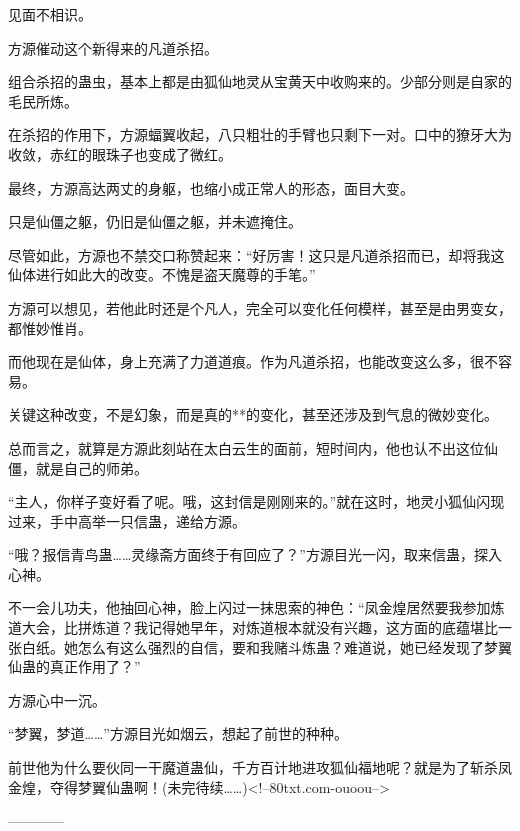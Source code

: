 \begin{this_body}
见面不相识。

方源催动这个新得来的凡道杀招。

组合杀招的蛊虫，基本上都是由狐仙地灵从宝黄天中收购来的。少部分则是自家的毛民所炼。

在杀招的作用下，方源蝠翼收起，八只粗壮的手臂也只剩下一对。口中的獠牙大为收敛，赤红的眼珠子也变成了微红。

最终，方源高达两丈的身躯，也缩小成正常人的形态，面目大变。

只是仙僵之躯，仍旧是仙僵之躯，并未遮掩住。

尽管如此，方源也不禁交口称赞起来：“好厉害！这只是凡道杀招而已，却将我这仙体进行如此大的改变。不愧是盗天魔尊的手笔。”

方源可以想见，若他此时还是个凡人，完全可以变化任何模样，甚至是由男变女，都惟妙惟肖。

而他现在是仙体，身上充满了力道道痕。作为凡道杀招，也能改变这么多，很不容易。

关键这种改变，不是幻象，而是真的**的变化，甚至还涉及到气息的微妙变化。

总而言之，就算是方源此刻站在太白云生的面前，短时间内，他也认不出这位仙僵，就是自己的师弟。

“主人，你样子变好看了呢。哦，这封信是刚刚来的。”就在这时，地灵小狐仙闪现过来，手中高举一只信蛊，递给方源。

“哦？报信青鸟蛊……灵缘斋方面终于有回应了？”方源目光一闪，取来信蛊，探入心神。

不一会儿功夫，他抽回心神，脸上闪过一抹思索的神色：“凤金煌居然要我参加炼道大会，比拼炼道？我记得她早年，对炼道根本就没有兴趣，这方面的底蕴堪比一张白纸。她怎么有这么强烈的自信，要和我赌斗炼蛊？难道说，她已经发现了梦翼仙蛊的真正作用了？”

方源心中一沉。

“梦翼，梦道……”方源目光如烟云，想起了前世的种种。

前世他为什么要伙同一干魔道蛊仙，千方百计地进攻狐仙福地呢？就是为了斩杀凤金煌，夺得梦翼仙蛊啊！(未完待续……)<!--80txt.com-ouoou-->

------------

\end{this_body}

